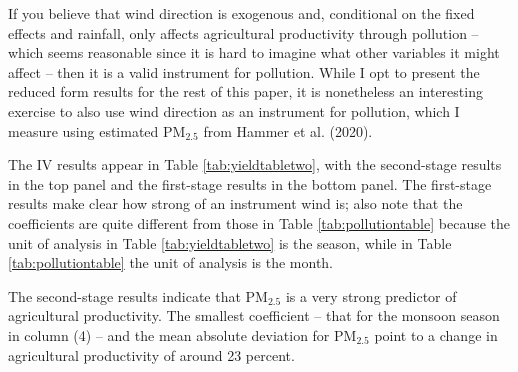 \documentclass[
]{article}
\begin{document}
If you believe that wind direction is exogenous and, conditional on the fixed effects and rainfall, only affects agricultural productivity through pollution -- which seems reasonable since it is hard to imagine what other variables it might affect -- then it is a valid instrument for
pollution. While I opt to present the reduced form results for the rest of this paper, it is nonetheless an interesting exercise to also use wind direction as an instrument for pollution, which I measure using estimated \(\mathrm{PM_{2.5}}\) from Hammer et al. (2020).

The IV results appear in Table \ref{tab:yieldtabletwo}, with the second-stage results in the top panel and the first-stage results in the bottom panel. The first-stage results make clear how strong of an instrument wind is; also note that the coefficients are quite different from those in Table \ref{tab:pollutiontable} because the unit of analysis in Table \ref{tab:yieldtabletwo} is the season, while in Table \ref{tab:pollutiontable} the unit of analysis is the month.

The second-stage results indicate that \(\mathrm{PM_{2.5}}\) is a very strong predictor of agricultural productivity. The smallest coefficient -- that for the monsoon season in column (4) -- and the mean absolute deviation for \(\mathrm{PM_{2.5}}\) point to a change in agricultural productivity of around 23 percent.
\end{document}
